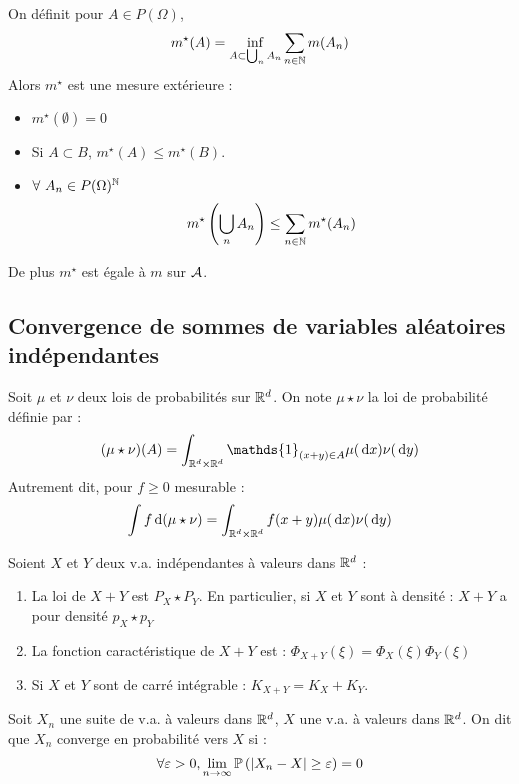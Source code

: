 \documentclass{cours}
\begin{document}
\begin{lemma}
    On définit pour $A \in P(\Omega)$, \[m^{\star}(A) = \inf_{A \subset \bigcup_{n} A_{n}} \sum_{n \in \mathbb{N}} m(A_{n})\]
    Alors $m^{\star}$ est une mesure extérieure :
    \begin{itemize}
        \item $m^{\star}(\emptyset) = 0$
        \item Si $A \subset B$, $m^{\star}(A) \leq m^{\star}(B)$.
        \item $\forall \ A_{n} \in P(\Omega)^{\mathbb{N}}$ \[
                  m^{\star}\left(\bigcup_{n} A_{n}\right) \leq \sum_{n \in \mathbb{N}} m^{\star}(A_{n})
              \]
    \end{itemize}
    De plus $m^{\star}$ est égale à $m$ sur $\mathcal{A}$.
\end{lemma}

\subsection{Convergence de sommes de variables aléatoires indépendantes}

\begin{definition}
    Soit $\mu$ et $\nu$ deux lois de probabilités sur $\mathbb{R}^{d}$. On note $\mu \star \nu$ la loi de probabilité définie par :
    \[
        (\mu \star \nu)(A) = \int_{\R^{d} \times \R^{d}} \mathds{1}_{(x + y) \in A} \mu(\d x) \nu(\d y)
    \]
    Autrement dit, pour $f \geq 0$ mesurable :
    \[
        \int f {\rm \, d}(\mu \star \nu) = \int_{\mathbb{R}^{d} \times \mathbb{R}^{d}} f(x + y)\mu({\rm \, d} x) \nu({\rm \, d} y)
    \]
\end{definition}

\begin{proposition}
    Soient $X$ et $Y$ deux v.a. indépendantes à valeurs dans $\mathbb{R}^{d}$ :
    \begin{enumerate}
        \item La loi de $X + Y$ est $P_{X} \star P_{Y}$. En particulier, si $X$ et $Y$ sont à densité : $X + Y$ a pour densité $p_{X} \star p_{Y}$
        \item La fonction caractéristique de $X + Y$ est : $\Phi_{X + Y}(\xi) = \Phi_{X}(\xi)\Phi_{Y}(\xi)$
        \item Si $X$ et $Y$ sont de carré intégrable : $K_{X + Y} = K_{X} + K_{Y}$.
    \end{enumerate}
\end{proposition}

\begin{definition}
    Soit $X_n$ une suite de v.a. à valeurs dans $\mathbb{R}^{d}$, $X$ une v.a. à valeurs dans $\mathbb{R}^{d}$. On dit que $X_{n}$ converge en probabilité vers $X$ si :
    \[
        \forall \varepsilon > 0, \lim_{n \to \infty} \mathbb{P}\left(\left|X_{n} - X\right| \geq \varepsilon\right) = 0
    \]
\end{definition}
\end{document}

